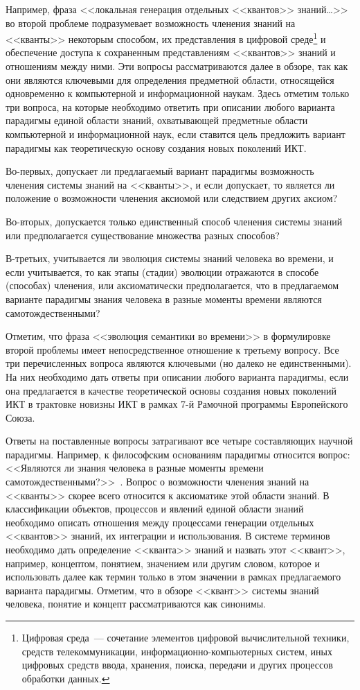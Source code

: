 \begin{multicols}{2}
      Например, фраза <<локальная генерация отдельных <<квантов>> знаний\ldots>> во
второй проблеме подра\-зу\-ме\-ва\-ет возможность членения знаний на <<кванты>> некоторым
способом, их представления в 
 циф\-ро\-вой среде\footnote{Цифровая среда~--- сочетание элементов
цифровой вычислительной техники, средств телекоммуникации, информационно-компьютерных систем,
иных цифровых средств ввода, хранения, поиска, передачи и других процессов обработки данных.} и
обеспечение доступа к сохраненным представлениям <<квантов>> знаний и отношениям между
ними. Эти вопросы рассматриваются далее в обзоре, так как они являются ключевыми для
определения предметной области, относящейся одновременно к компьютерной и
информационной наукам. Здесь отметим только три вопроса, на которые необходимо ответить
при описании любого варианта парадигмы единой области знаний, охватывающей предметные
области компьютерной и информационной наук, если ставится цель предложить вариант
парадигмы как теоретическую основу создания новых поколений ИКТ.

      Во-первых, допускает ли предлагаемый вариант парадигмы возможность членения
системы знаний на <<кванты>>, и если допускает, то является ли положение о возможности
членения аксиомой или следствием других аксиом? 

Во-вторых, допускается только
единственный способ членения системы знаний или предполагается существование множества
разных способов? 

В-третьих, учитывается ли эволюция системы знаний человека во времени, и
если учитывается, то как этапы (стадии) эволюции отражаются в способе (способах) членения,
или аксиоматически предполагается, что в предлагаемом варианте парадигмы знания человека
в разные моменты времени являются самотождественными?

      Отметим, что фраза <<эволюция семантики во времени>> в формулировке второй
проблемы имеет непосредственное отношение к третьему вопросу. Все три перечисленных
вопроса являются ключевыми (но далеко не единственными). На них необходимо дать ответы
при описании любого варианта парадигмы, если она предлагается в качестве теоретической
основы создания новых поколений ИКТ в трактовке новизны ИКТ в рамках 7-й Рамочной
программы Европейского Союза.

      Ответы на поставленные вопросы затрагивают все четыре составляющих научной
парадигмы. Например, к философским основаниям парадигмы относится вопрос: <<Являются
ли знания человека в разные моменты времени самотождественными?>>~\cite{9za}. Вопрос
о возможности членения знаний на <<кванты>> скорее всего относится к аксиоматике этой
области знаний. В классификации объектов, процессов и явлений единой области знаний
необходимо описать отношения между процессами генерации отдельных <<квантов>> знаний,
их интеграции и использования. В системе терминов необходимо дать определение <<кванта>>
знаний и назвать этот <<квант>>, например, концептом, понятием, значением или другим
словом, которое и использовать далее как термин только в этом значении в рамках
предлагаемого варианта парадигмы. Отметим, что в обзоре <<квант>> системы знаний
человека, понятие и концепт рассматриваются как синонимы.


\end{multicols}
